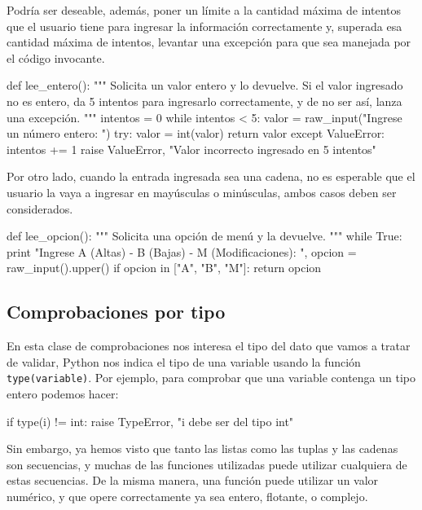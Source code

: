 Podría ser deseable, además, poner un límite a la cantidad máxima de intentos
que el usuario tiene para ingresar la información correctamente y, superada
esa cantidad máxima de intentos, levantar una excepción para que sea manejada
por el código invocante.

\begin{codigo-python-sn}
def lee_entero():
    """ Solicita un valor entero y lo devuelve.
        Si el valor ingresado no es entero, da 5 intentos para ingresarlo
        correctamente, y de no ser así, lanza una excepción. """
    intentos = 0
    while intentos < 5:
        valor = raw_input("Ingrese un número entero: ")
        try:
            valor = int(valor)
            return valor
        except ValueError:
            intentos += 1
    raise ValueError, "Valor incorrecto ingresado en 5 intentos"
\end{codigo-python-sn}

Por otro lado, cuando la entrada ingresada sea una cadena, no es esperable que
el usuario la vaya a ingresar en mayúsculas o minúsculas, ambos casos deben
ser considerados.

\begin{codigo-python-sn}
def lee_opcion():
    """ Solicita una opción de menú y la devuelve. """
    while True:
        print "Ingrese A (Altas) - B (Bajas) - M (Modificaciones): ",
        opcion = raw_input().upper()
        if opcion in ["A", "B", "M"]:
            return opcion
\end{codigo-python-sn}

\subsection{Comprobaciones por tipo}

En esta clase de comprobaciones nos interesa el tipo del dato que vamos a
tratar de validar, Python nos indica el tipo de una variable usando la
función \lstinline!type(variable)!. Por ejemplo, para comprobar que una
variable contenga un tipo entero podemos hacer:

\begin{codigo-python-sn}
if type(i) != int:
	raise TypeError, "i debe ser del tipo int"
\end{codigo-python-sn}

Sin embargo, ya hemos visto que tanto las listas como las tuplas y las
cadenas son secuencias, y muchas de las funciones utilizadas puede utilizar
cualquiera de estas secuencias. De la misma manera, una función puede
utilizar un valor numérico, y que opere correctamente ya sea entero,
flotante, o complejo.

